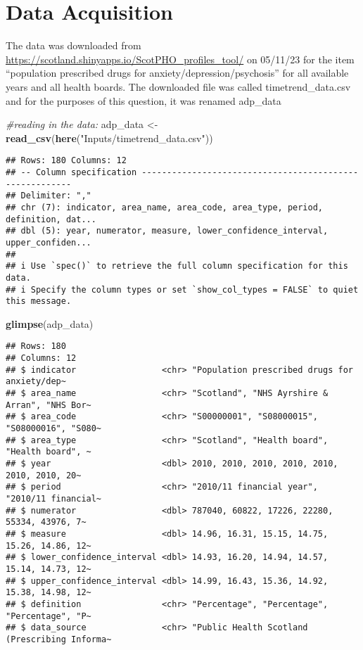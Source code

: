 \documentclass[
]{article}
\newenvironment{Shaded}{\begin{snugshade}}{\end{snugshade}}
\newcommand{\CommentTok}[1]{\textcolor[rgb]{0.56,0.35,0.01}{\textit{#1}}}
\newcommand{\FunctionTok}[1]{\textcolor[rgb]{0.13,0.29,0.53}{\textbf{#1}}}
\newcommand{\NormalTok}[1]{#1}
\newcommand{\OtherTok}[1]{\textcolor[rgb]{0.56,0.35,0.01}{#1}}
\newcommand{\StringTok}[1]{\textcolor[rgb]{0.31,0.60,0.02}{#1}}
\begin{document}
\hypertarget{data-acquisition}{%
\section{Data Acquisition}\label{data-acquisition}}

The data was downloaded from
\url{https://scotland.shinyapps.io/ScotPHO_profiles_tool/} on 05/11/23
for the item ``population prescribed drugs for
anxiety/depression/psychosis'' for all available years and all health
boards. The downloaded file was called timetrend\_data.csv and for the
purposes of this question, it was renamed adp\_data

\begin{Shaded}
\begin{Highlighting}[]
\CommentTok{\#reading in the data:}
\NormalTok{adp\_data }\OtherTok{\textless{}{-}} \FunctionTok{read\_csv}\NormalTok{(}\FunctionTok{here}\NormalTok{(}\StringTok{"Inputs/timetrend\_data.csv"}\NormalTok{))}
\end{Highlighting}
\end{Shaded}

\begin{verbatim}
## Rows: 180 Columns: 12
## -- Column specification --------------------------------------------------------
## Delimiter: ","
## chr (7): indicator, area_name, area_code, area_type, period, definition, dat...
## dbl (5): year, numerator, measure, lower_confidence_interval, upper_confiden...
## 
## i Use `spec()` to retrieve the full column specification for this data.
## i Specify the column types or set `show_col_types = FALSE` to quiet this message.
\end{verbatim}

\begin{Shaded}
\begin{Highlighting}[]
\FunctionTok{glimpse}\NormalTok{(adp\_data)}
\end{Highlighting}
\end{Shaded}

\begin{verbatim}
## Rows: 180
## Columns: 12
## $ indicator                 <chr> "Population prescribed drugs for anxiety/dep~
## $ area_name                 <chr> "Scotland", "NHS Ayrshire & Arran", "NHS Bor~
## $ area_code                 <chr> "S00000001", "S08000015", "S08000016", "S080~
## $ area_type                 <chr> "Scotland", "Health board", "Health board", ~
## $ year                      <dbl> 2010, 2010, 2010, 2010, 2010, 2010, 2010, 20~
## $ period                    <chr> "2010/11 financial year", "2010/11 financial~
## $ numerator                 <dbl> 787040, 60822, 17226, 22280, 55334, 43976, 7~
## $ measure                   <dbl> 14.96, 16.31, 15.15, 14.75, 15.26, 14.86, 12~
## $ lower_confidence_interval <dbl> 14.93, 16.20, 14.94, 14.57, 15.14, 14.73, 12~
## $ upper_confidence_interval <dbl> 14.99, 16.43, 15.36, 14.92, 15.38, 14.98, 12~
## $ definition                <chr> "Percentage", "Percentage", "Percentage", "P~
## $ data_source               <chr> "Public Health Scotland (Prescribing Informa~
\end{verbatim}
\end{document}
